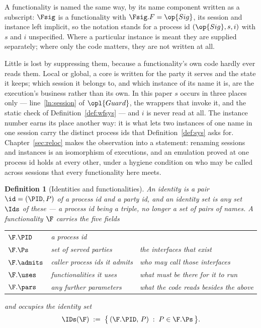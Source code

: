 \documentclass[10pt,oneside,openany]{book}
\theoremstyle{accentdef}
\newtheorem{definition}{Definition}[chapter]
\theoremstyle{accentplain}
\begin{document}
A functionality is named the same way, by its name component written as a subscript: $\Fsig$ is a
functionality with $\Fsig.F = \op{Sig}$, its session and instance left implicit, so the notation
stands for a process id $(\op{Sig},s,i)$ with $s$ and $i$ unspecified. Where a particular instance
is meant they are supplied separately; where only the code matters, they are not written at all.

Little is lost by suppressing them, because a functionality's own code hardly ever reads them.
Local or global, a core is written for the party it serves and the state it keeps; which session
it belongs to, and which instance of its name it is, are the execution's business rather than its
own. In this paper $s$ occurs in three places only --- line~\ref{ln:session} of $\opl{Guard}$, the
wrappers that invoke it, and the static check of Definition~\ref{def:wfsys} --- and $i$ is never
read at all. The instance number earns its place another way: it is what lets two instances of one
name in one session carry the distinct process ids that Definition~\ref{def:sys} asks for.
Chapter~\ref{sec:reloc} makes the observation into a statement: renaming sessions and instances is
an isomorphism of executions, and an emulation proved at one process id holds at every other, under a
hygiene condition on who may be called across sessions that every functionality here meets.

\begingroup{}
\begin{definition}[Identities and functionalities]\label{def:func}
An \emph{identity} is a pair $\id = (\PID,P)$ of a process id and a party id, and an
\emph{identity set} is any set $\Ids$ of these --- a process id being a triple, no longer a set
of pairs of names. A
\emph{functionality} $\F$ carries the five fields
\begin{center}
\footnotesize
\begin{tabular}{@{}ll l@{}}
\toprule
$\F.\PID$   & a process id                          & \\
$\F.\Ps$    & set of \emph{served} parties          & the interfaces that exist \\
$\F.\admits$  & caller process ids it admits              & who may call those interfaces \\
$\F.\uses$  & functionalities it \emph{uses}            & what must be there for it to run \\
$\F.\pars$  & any further parameters                        & what the code reads besides the above \\
\bottomrule
\end{tabular}
\end{center}
and \emph{occupies} the identity set
\[
  \IDs(\F) \;:=\; \bigl\{\, (\F.\PID,\, P) \;:\; P \in \F.\Ps \,\bigr\} .
\]
\end{definition}
\endgroup
\end{document}
